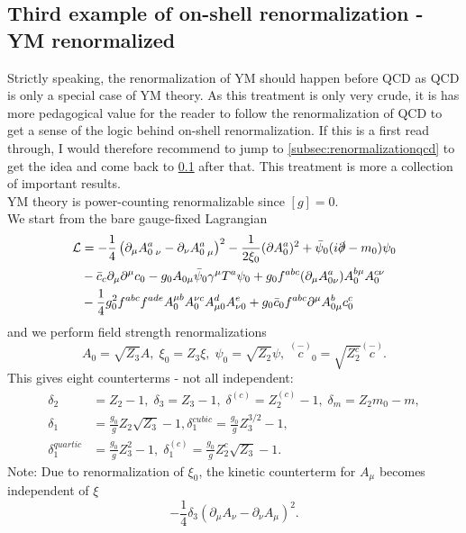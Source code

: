 \subsection{Third example of on-shell renormalization - YM renormalized}
\label{subsec:renormalizationYM}
Strictly speaking, the renormalization of YM should happen before QCD as QCD is only a special case of YM theory. As this treatment is only very crude, it is has more pedagogical value for the reader to follow the renormalization of QCD to get a sense of the logic behind on-shell renormalization. If this is a first read through, I would therefore recommend to jump to \ref{subsec:renormalizationqcd} to get the idea and come back to \ref{subsec:renormalizationYM} after that. This treatment is more a collection of important results.\\
YM theory is power-counting renormalizable since $[g]=0$.\\
We start from the bare gauge-fixed Lagrangian
\begin{align*}
	\mathcal{L} &= - \frac{1}{4} \left(\partial_\mu A^a_{0\;\nu} - \partial_\nu A^a_{0 \; \mu} \right)^2 - \frac{1}{2 \xi_0} (\partial A^a_0)^2 + \bar{\psi}_0 (i \slashed{\partial} - m_0) \psi_0 \\
	& - \bar{c}_c \partial_\mu \partial^\mu c_0 - g_0 A_{0\mu} \bar{\psi}_0 \gamma^\mu T^a \psi_0 + g_0 f^{abc} (\partial_\mu A^a_{0\nu}) A^{b\mu}_0 A^{c \nu}_0 \\
	&-\frac{1}{4} g^2_0 f^{abc} f^{ade} A^{\mu b}_0 A^{\nu c}_0 A^d_{\mu 0} A^e_{\nu 0} + g_0 \bar{c}_0 f^{abc} \partial^\mu A^b_{0 \mu} c^c_0
\end{align*}
and we perform field strength renormalizations
\begin{equation}
A_0 = \sqrt{Z_3}A, \; \xi_0=Z_3 \xi, \; \psi_0= \sqrt{Z_2}\psi, \; \stackrel{(-)}{c}_0 = \sqrt{Z^c_2} \stackrel{(-)}{c}.
\end{equation}
This gives eight counterterms - not all independent:
\begin{align*}
	\delta_2 &=Z_2 -1, \; \delta_3 = Z_3-1, \; \delta^{(c)} = Z^{(c)}_2 -1, \; \delta_m = Z_2 m_0 -m,\\
	\delta_1 &= \frac{g_0}{g} Z_2 \sqrt{Z_3}-1, \delta^{cubic}_1 = \frac{g_0}{g} Z^{3/2}_3-1,\\
	\delta^{quartic}_1 &= \frac{g_0}{g}Z^2_3-1, \; \delta^{(c)}_1 = \frac{g_0}{g} Z^c_2 \sqrt{Z_3}-1.
\end{align*}
Note: Due to renormalization of $\xi_0$, the kinetic counterterm for $A_\mu$ becomes independent of $\xi$
\begin{equation*}
	-\frac{1}{4} \delta_3 ( \partial_\mu A_\nu - \partial_\nu A_\mu)^2.
\end{equation*}
